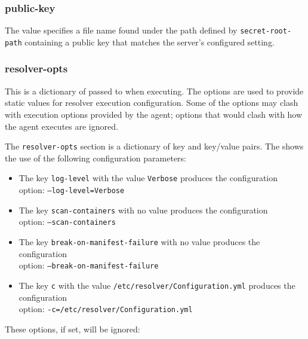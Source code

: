 \subsubsection{public-key}\label{sec:agent-public-key}
The value specifies a file name found under the path defined by \texttt{secret-root-path} containing a 
public key that matches the server's configured  setting.

\subsubsection{resolver-opts}\label{sec:agent-resolver-opts}
This is a dictionary of
passed to \scaresolver when executing.  The options are used to provide static values for resolver execution configuration.  Some of the
options may clash with execution options provided by the agent; options that would clash with how the agent executes \scaresolver are ignored.  

The \texttt{resolver-opts} section is a dictionary of key and key/value pairs. The 
shows the use of the following \scaresolver configuration parameters:

\begin{itemize}
  \item The key \texttt{log-level} with the value \texttt{Verbose} produces the configuration\\option: \texttt{--log-level=Verbose}
  \item The key \texttt{scan-containers} with no value produces the configuration\\option: \texttt{--scan-containers}
  \item The key \texttt{break-on-manifest-failure} with no value produces the configuration\\option: \texttt{--break-on-manifest-failure}
  \item The key \texttt{c} with the value \texttt{/etc/resolver/Configuration.yml} produces the configuration\\option: \texttt{-c=/etc/resolver/Configuration.yml}
\end{itemize}


These options, if set, will be ignored:

